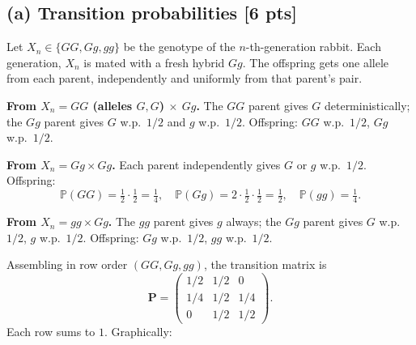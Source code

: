 \documentclass[12pt]{article}
\newcommand{\Prb}{\mathbb{P}}
\newcommand{\mat}[1]{\bm{#1}}
\begin{document}
\subsection*{(a) Transition probabilities [6 pts]}

Let $X_n\in\{GG,Gg,gg\}$ be the genotype of the $n$-th-generation rabbit. Each generation, $X_n$ is mated with a fresh hybrid $Gg$. The offspring gets one allele from each parent, independently and uniformly from that parent's pair.

\textbf{From $X_n=GG$ (alleles $G,G$) $\times$ $Gg$.} The $GG$ parent gives $G$ deterministically; the $Gg$ parent gives $G$ w.p.\ $1/2$ and $g$ w.p.\ $1/2$. Offspring: $GG$ w.p.\ $1/2$, $Gg$ w.p.\ $1/2$.

\textbf{From $X_n=Gg\times Gg$.} Each parent independently gives $G$ or $g$ w.p.\ $1/2$. Offspring:
\[
  \Prb(GG)=\tfrac12\cdot\tfrac12=\tfrac14,\quad \Prb(Gg)=2\cdot\tfrac12\cdot\tfrac12=\tfrac12,\quad \Prb(gg)=\tfrac14.
\]

\textbf{From $X_n=gg\times Gg$.} The $gg$ parent gives $g$ always; the $Gg$ parent gives $G$ w.p.\ $1/2$, $g$ w.p.\ $1/2$. Offspring: $Gg$ w.p.\ $1/2$, $gg$ w.p.\ $1/2$.

Assembling in row order $(GG,Gg,gg)$, the transition matrix is
\[
  \mat{P}=\begin{pmatrix}
    1/2 & 1/2 & 0 \\
    1/4 & 1/2 & 1/4 \\
    0   & 1/2 & 1/2
  \end{pmatrix}.
\]
Each row sums to $1$. Graphically:
\begin{center}
\end{center}
\end{document}
